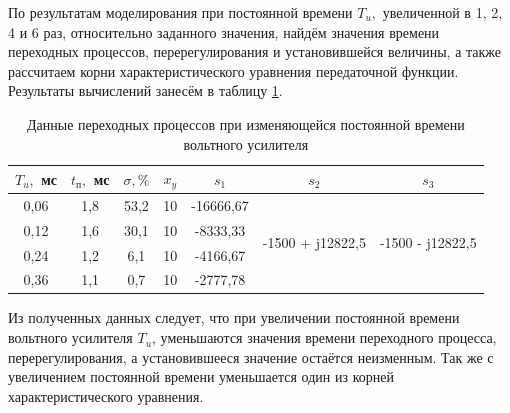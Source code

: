 \documentclass[fleqn, a4paper, 11pt, russian]{article}
\begin{document}
	\newpage
	По результатам моделирования при постоянной времени $T_u,$ увеличенной в 1, 2, 4 и 6 раз, относительно заданного значения, найдём значения времени переходных процессов, перерегулирования и установившейся величины, а также рассчитаем корни характеристического уравнения передаточной функции. Результаты вычислений занесём в таблицу \ref{tvarTab}.
	\begin{table}[ht!]
		\centering
		\begin{threeparttable}
			\caption{Данные переходных процессов при изменяющейся постоянной времени вольтного усилителя}
			\begin{tabular}{|c|c|c|c|c|c|c|}
				\hline
				$T_u,$ мс	& $t_\text{п},$ мс	& $\sigma, \%$	& $x_y$	& $s_1$		& $s_2$								& $s_3$								\\\hline
				0,06		& 1,8				& 53,2			& 10	& -16666,67	& \multirow{4}{*}{-1500 + j12822,5}	& \multirow{4}{*}{-1500 - j12822,5} \\\cline{1-5}
				0,12		& 1,6				& 30,1			& 10	& -8333,33	&	& 	\\\cline{1-5}
				0,24		& 1,2				& 6,1			& 10	& -4166,67	& 	&	\\\cline{1-5}
				0,36		& 1,1				& 0,7			& 10	& -2777,78	&	&	\\\hline
			\end{tabular}
		\end{threeparttable}
		\label{tvarTab}
	\end{table}
	
	Из полученных данных следует, что при увеличении постоянной времени вольтного усилителя $T_u$, уменьшаются значения времени переходного процесса, перерегулирования, а установившееся значение остаётся неизменным. Так же с увеличением постоянной времени уменьшается один из корней характеристического уравнения.
	\clearpage
\end{document}
